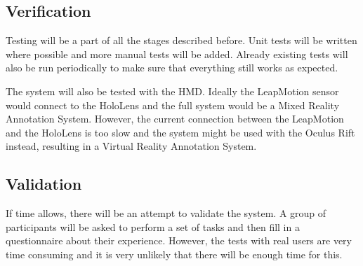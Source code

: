 \documentclass[a4paper, 12pt]{article}
\begin{document}
\subsection{Verification}
Testing will be a part of all the stages described before. Unit tests will be written where possible and more manual tests will be added. Already existing tests will also be run periodically to make sure that everything still works as expected.

The system will also be tested with the HMD. Ideally the LeapMotion sensor would connect to the HoloLens and the full system would be a Mixed Reality Annotation System. However, the current connection between the LeapMotion and the HoloLens is too slow and the system might be used with the Oculus Rift instead, resulting in a Virtual Reality Annotation System.

\vspace{-0.3cm}
\subsection{Validation}
If time allows, there will be an attempt to validate the system. A group of participants will be asked to perform a set of tasks and then fill in a questionnaire about their experience. However, the tests with real users are very time consuming and it is very unlikely that there will be enough time for this.



\end{document}
